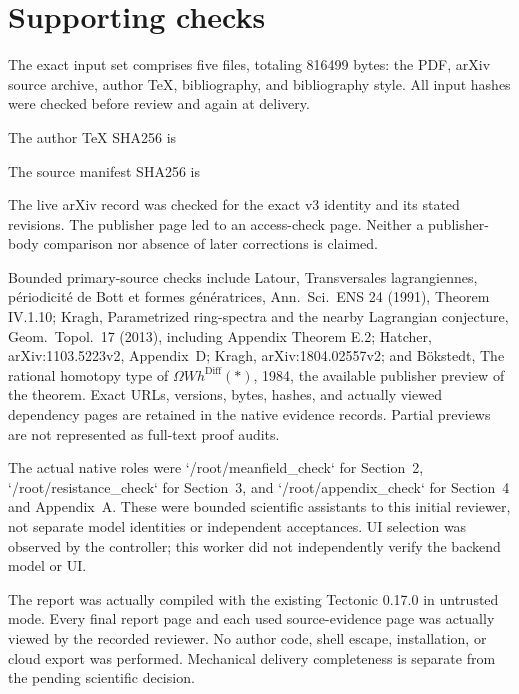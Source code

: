 \documentclass[10pt]{article}
\begin{document}
\section*{Supporting checks}
The exact input set comprises five files, totaling 816499 bytes: the PDF, arXiv source archive, author TeX, bibliography, and bibliography style. All input hashes were checked before review and again at delivery.\par
The author TeX SHA256 is\par
The source manifest SHA256 is\par
The live arXiv record was checked for the exact v3 identity and its stated revisions. The publisher page led to an access-check page. Neither a publisher-body comparison nor absence of later corrections is claimed.\par
Bounded primary-source checks include Latour, Transversales lagrangiennes, périodicité de Bott et formes génératrices, Ann. Sci. ENS 24 (1991), Theorem IV.1.10; Kragh, Parametrized ring-spectra and the nearby Lagrangian conjecture, Geom. Topol. 17 (2013), including Appendix Theorem E.2; Hatcher, arXiv:1103.5223v2, Appendix D; Kragh, arXiv:1804.02557v2; and Bökstedt, The rational homotopy type of \(\Omega Wh^{\mathrm{Diff}}(*)\), 1984, the available publisher preview of the theorem. Exact URLs, versions, bytes, hashes, and actually viewed dependency pages are retained in the native evidence records. Partial previews are not represented as full-text proof audits.\par
The actual native roles were `/root/meanfield\_check` for Section 2, `/root/resistance\_check` for Section 3, and `/root/appendix\_check` for Section 4 and Appendix A. These were bounded scientific assistants to this initial reviewer, not separate model identities or independent acceptances. UI selection was observed by the controller; this worker did not independently verify the backend model or UI.\par
The report was actually compiled with the existing Tectonic 0.17.0 in untrusted mode. Every final report page and each used source-evidence page was actually viewed by the recorded reviewer. No author code, shell escape, installation, or cloud export was performed. Mechanical delivery completeness is separate from the pending scientific decision.\par
\end{document}
